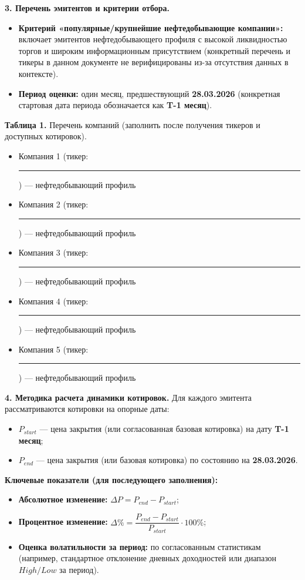\documentclass[12pt]{article}
\begin{document}
\bigskip

\noindent
\textbf{3. Перечень эмитентов и критерии отбора.}
\begin{itemize}
    \item \textbf{Критерий «популярные/крупнейшие нефтедобывающие компании»:} включает эмитентов нефтедобывающего профиля с высокой ликвидностью торгов и широким информационным присутствием (конкретный перечень и тикеры в данном документе не верифицированы из-за отсутствия данных в контексте).
    \item \textbf{Период оценки:} один месяц, предшествующий \textbf{28.03.2026} (конкретная стартовая дата периода обозначается как \textbf{T-1 месяц}).
\end{itemize}

\medskip
\noindent
\textbf{Таблица 1.} Перечень компаний (заполнить после получения тикеров и доступных котировок).
\begin{itemize}
    \item Компания 1 (тикер: \rule{4cm}{0.4pt}) — нефтедобывающий профиль
    \item Компания 2 (тикер: \rule{4cm}{0.4pt}) — нефтедобывающий профиль
    \item Компания 3 (тикер: \rule{4cm}{0.4pt}) — нефтедобывающий профиль
    \item Компания 4 (тикер: \rule{4cm}{0.4pt}) — нефтедобывающий профиль
    \item Компания 5 (тикер: \rule{4cm}{0.4pt}) — нефтедобывающий профиль
\end{itemize}

\bigskip

\noindent
\textbf{4. Методика расчета динамики котировок.}
Для каждого эмитента рассматриваются котировки на опорные даты:
\begin{itemize}
    \item $P_{start}$ — цена закрытия (или согласованная базовая котировка) на дату \textbf{T-1 месяц};
    \item $P_{end}$ — цена закрытия (или базовая котировка) по состоянию на \textbf{28.03.2026}.
\end{itemize}

\medskip
\noindent
\textbf{Ключевые показатели (для последующего заполнения):}
\begin{itemize}
    \item \textbf{Абсолютное изменение:} $\Delta P = P_{end} - P_{start}$;
    \item \textbf{Процентное изменение:} $\Delta \% = \dfrac{P_{end} - P_{start}}{P_{start}} \cdot 100\%$;
    \item \textbf{Оценка волатильности за период:} по согласованным статистикам (например, стандартное отклонение дневных доходностей или диапазон $High/Low$ за период).
\end{itemize}
\end{document}
